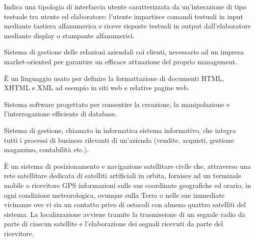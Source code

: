 \begin{acronym}[HTML5]
	
	{\small Indica una tipologia di interfaccia utente caratterizzata da un'interazione di tipo testuale tra utente ed elaboratore: l'utente impartisce comandi testuali in input mediante tastiera alfanumerica e riceve risposte testuali in output dall'elaboratore mediante display o stampante alfanumerici. \par}
	
	
	{\small Sistema di gestione delle relazioni aziendali coi clienti, necessario ad un impresa market-oriented per garantire un efficace attuazione del proprio management. \par}
	
	
	{\small È un linguaggio usato per definire la formattazione di documenti HTML, XHTML e XML ad esempio in siti web e relative pagine web. \par}
	
	
	{\small  Sistema software progettato per consentire la creazione, la manipolazione e l'interrogazione efficiente  di database. \par}

	
	{\small Sistema di gestione, chiamato in informatica sistema informativo, che integra tutti i processi di business rilevanti di un'azienda (vendite, acquisti, gestione magazzino, contabilità etc.). \par}
	
	
	{\small È un sistema di posizionamento e navigazione satellitare civile che, attraverso una rete satellitare dedicata di satelliti artificiali in orbita, fornisce ad un terminale mobile o ricevitore GPS informazioni sulle sue coordinate geografiche ed orario, in ogni condizione meteorologica, ovunque sulla Terra o nelle sue immediate vicinanze ove vi sia un contatto privo di ostacoli con almeno quattro satelliti del sistema. La localizzazione avviene tramite la trasmissione di un segnale radio da parte di ciascun satellite e l'elaborazione dei segnali ricevuti da parte del ricevitore. \par}

	

\end{acronym}
